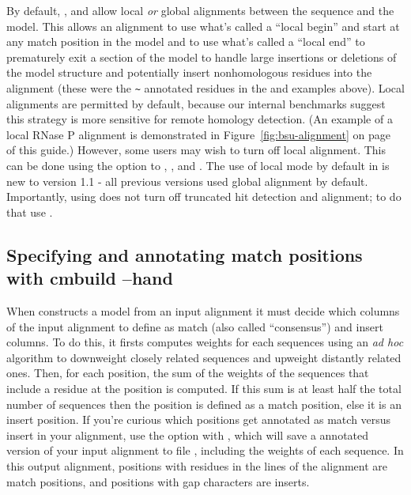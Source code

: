 By default, ,  and  allow
local \emph{or} global alignments between the sequence and the
model. This allows an alignment to use what's called a ``local begin''
and start at any match position in the model and to use what's called
a ``local end'' to prematurely exit a section of the model to handle
large insertions or deletions of the model structure and potentially
insert nonhomologous residues into the alignment (these were the
\verb+~+ annotated residues in the  and 
examples above). Local alignments are permitted by default, because
our internal benchmarks suggest this strategy is more sensitive for
remote homology detection. (An example of a local RNase P alignment is
demonstrated in Figure~\ref{fig:bsu-alignment} on
page~\pageref{fig:bsu-alignment} of this guide.)
However, some users may wish to turn off local alignment. This can be
done using the  option to , ,
and . The use of local mode by default in 
is new to version 1.1 - all previous versions used global alignment by
default. Importantly, using  does not turn off truncated hit
detection and alignment; to do that use .

\subsection{Specifying and annotating match positions with cmbuild --hand}

When  constructs a model from an input alignment it must
decide which columns of the input alignment to define as match (also
called ``consensus'') and insert columns. To do this, it firsts
computes weights for each sequences using an \emph{ad hoc} algorithm
to downweight closely related sequences and upweight distantly related
ones. Then, for each position, the sum of the weights of the sequences
that include a residue at the position is computed. If this sum is at
least half the total number of sequences then the position is defined
as a match position, else it is an insert position. If you're curious
which positions get annotated as match versus insert in your
alignment, use the  option with , which
will save a annotated version of your input alignment to file
, including the weights of each sequence. In this output
alignment, positions with residues in the  lines of
the alignment are match positions, and positions with gap characters
are inserts.

